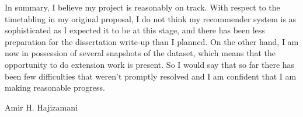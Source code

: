 \documentclass[a4paper,11pt,titlepage]{article}
\begin{document}
\bigskip

In summary, I believe my project is reasonably on track. With respect to the timetabling in my original proposal, I do not think my recommender system is as sophisticated as I expected it to be at this stage, and there has been less preparation for the dissertation write-up than I planned. On the other hand, I am now in possession of several snapshots of the dataset, which means that the opportunity to do extension work is present. So I would say that so far there has been few difficulties that weren't promptly resolved and I am confident that I am making reasonable progress.

\bigskip

\begin{flushright}
 Amir H. Hajizamani
\end{flushright}


\end{document}
